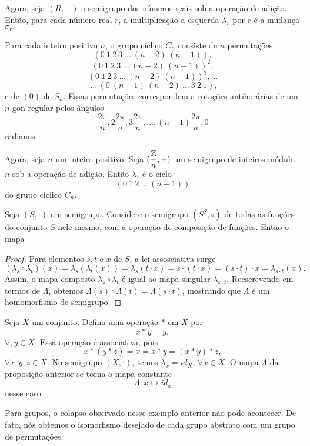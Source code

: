 \begin{definition}[Magma]
\begin{exmp}
      Agora, seja $(R,+)$ o semigrupo dos números reais sob a operação de adição. Então, para cada número real $r$, a multiplicação a esquerda $\lambda_{r}$ por $r$ é a mudança $\sigma_{r}.$
   \end{exmp}
   \begin{exmp}
      Para cada inteiro positivo $n$, o grupo cíclico $C_{n}$ consiste de $n$ permutações $$\left(0\ 1\ 2\ 3\ ...\ (n-2)\ (n-1)\right),$$ $$\left(0\ 1\ 2\ 3\ ...\ (n-2)\ (n-1)\right)^{2},$$ $$\left(0\ 1\ 2\ 3\ ...\ (n-2)\ (n-1)\right)^{3}, ...$$ $$... ,\left(0\ (n-1)\ (n-2)\ ...\ 3\ 2\ 1\right),$$ e de $(0)$ de $S_{n}$. Essas permutações correspondem a rotações antihorárias de um $n$-gon regular pelos ângulos
      $$\dfrac{2\pi}{n}, 2\dfrac{2\pi}{n}, 3\dfrac{2\pi}{n}, ... , (n-1)\dfrac{2\pi}{n}, 0$$ radianos.

      Agora, seja $n$ um inteiro positivo. Seja $(\dfrac{\mathbb{Z}}{n}, +)$ um semigrupo de inteiros módulo $n$ sob a operação de adição. Então $\lambda_{1}$ é o ciclo $$(0\ 1\ 2\ ...\ (n-1))$$ do grupo cíclico $C_{n}$.
   \end{exmp}

   \begin{stat}
      Seja $(S,\cdot)$ um semigrupo. Considere o semigrupo $(S^{S}, \circ)$ de todas as funções do conjunto $S$ nele mesmo, com a operação de composição de funções. Então o mapa
      \begin{proof}
         Para elementos $s,t$ e $x$ de $S$, a lei assosciativa surge $$(\lambda_{s} \circ \lambda_{t})(x) = \lambda_{s}(\lambda_{t}(x)) = \lambda_{s}(t\cdot x) = s \cdot (t \cdot x) = (s \cdot t) \cdot x = \lambda_{s\cdot t } (x).$$
         Assim, o mapa composto $\lambda_{s} \circ \lambda_{t}$ é igual ao mapa singular $\lambda_{s\cdot t}$. Reescrevendo em termos de $\Lambda$, obtemos $\Lambda(s) \circ \Lambda (t) = \Lambda(s\cdot t)$, mostrando que $\Lambda$ é um homomorfismo de semigrupo.
      \end{proof}
   \end{stat}
   \begin{exmp}
      Seja $X$ um conjunto. Defina uma operação $*$ em $X$ por $$x * y = y,$$ $\forall, y \in X$. Essa operação é associativa, pois $$x * (y * z) = x = x * y = (x * y) * z,$$ $\forall x, y , z \in X$. No semigrupo $(X, \cdot)$, temos $\lambda_{x} = id_{X}$, $\forall x \in X$. O mapa $\Lambda$ da proposição anterior se torna o mapa constante $$\Lambda: x \mapsto id_{x}$$ nesse caso.
   \end{exmp}
   Para grupos, o colapso observado nesse exemplo anterior não pode acontecer. De fato, nós obtemos o isomorfismo desejado de cada grupo abstrato com um grupo de permutações.


\end{definition}
